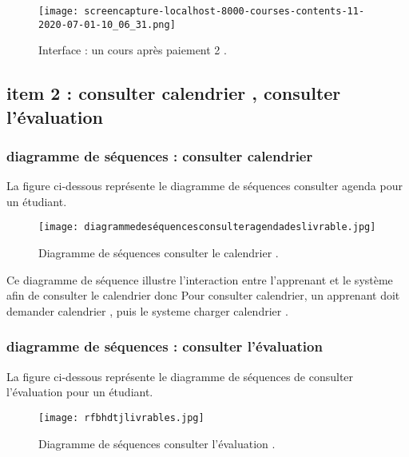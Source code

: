 \begin{figure}[ht]
	\centering
	\texttt{[image: screencapture-localhost-8000-courses-contents-11-2020-07-01-10\_06\_31.png]}
	\caption{Interface : un cours après paiement 2 .}
	\label{fig:Interface :un cours après paiement 2 }
\end{figure}
\FloatBarrier





\clearpage
\subsection{item 2 : consulter calendrier , consulter l'évaluation }
\subsubsection{diagramme de séquences : consulter calendrier }
La figure  ci-dessous représente le diagramme de séquences consulter agenda pour un  étudiant.

\begin{figure}[ht]
	\centering
	\texttt{[image: diagrammedeséquencesconsulteragendadeslivrable.jpg]}
	\caption{Diagramme de séquences consulter le calendrier  .}
	\label{fig:Diagramme de séquences consulter le calendrier }
\end{figure}
\FloatBarrier

Ce diagramme de séquence illustre l'interaction entre l'apprenant et le système afin de consulter le
calendrier donc  Pour consulter calendrier, un apprenant doit  demander calendrier , puis le systeme charger calendrier .

\subsubsection{diagramme de séquences : consulter l'évaluation }
La figure  ci-dessous représente le diagramme de séquences de consulter l'évaluation  pour un  étudiant.

\begin{figure}[ht]
	\centering
	\texttt{[image: rfbhdtjlivrables.jpg]}
	\caption{Diagramme de séquences consulter l'évaluation   .}
	\label{fig:Diagramme de séquences consulter l'évaluation  }
\end{figure}
\FloatBarrier

